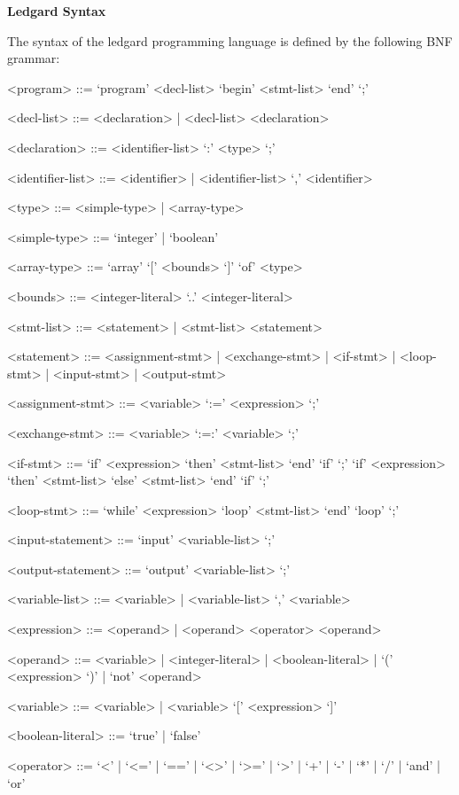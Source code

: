 \documentclass[11pt]{article}
\begin{document}
\begin{center}
    {\huge\bf Ledgard Syntax}
\end{center}
\hrulefill
\setlength{\grammarindent}{15em}

The syntax of the ledgard programming language is defined by the
following BNF grammar:
\begin{grammar}
        <program> ::= `program' <decl-list> `begin' <stmt-list> `end' `;'

        <decl-list> ::= <declaration> | <decl-list> <declaration>

        <declaration> ::= <identifier-list> `:' <type> `;'

        <identifier-list> ::= <identifier> | <identifier-list> `,'
            <identifier>

        <type> ::= <simple-type> | <array-type>

        <simple-type> ::= `integer' | `boolean'

        <array-type> ::= `array' `[' <bounds> `]' `of' <type>

        <bounds> ::= <integer-literal> `..' <integer-literal>

        <stmt-list> ::= <statement> | <stmt-list> <statement>

        <statement> ::= <assignment-stmt> | <exchange-stmt>
            | <if-stmt>  | <loop-stmt> | <input-stmt> | <output-stmt>

        <assignment-stmt> ::= <variable> `:=' <expression> `;'

        <exchange-stmt> ::= <variable> `:=:' <variable> `;'

        <if-stmt> ::= `if' <expression> `then' <stmt-list> `end' `if' `;'
            \alt `if' <expression> `then' <stmt-list> `else'
            <stmt-list> `end' `if' `;'

        <loop-stmt> ::= `while' <expression> `loop' <stmt-list> `end'
            `loop' `;'

        <input-statement> ::= `input' <variable-list> `;'

        <output-statement> ::= `output' <variable-list> `;'

        <variable-list> ::= <variable> | <variable-list> `,'
            <variable>

        <expression> ::= <operand> | <operand> <operator> <operand>

        <operand> ::= <variable> | <integer-literal>
            | <boolean-literal> | `(' <expression> `)' |
            `not' <operand>

        <variable> ::= <variable> | <variable> `[' <expression> `]'

        <boolean-literal> ::= `true' | `false'

        <operator> ::= `<' | `<=' | `==' | `<>' | `>=' | `>' |
          `+' | `-' | `*' | `/' | `and' | `or'
\end{grammar}
\end{document}

